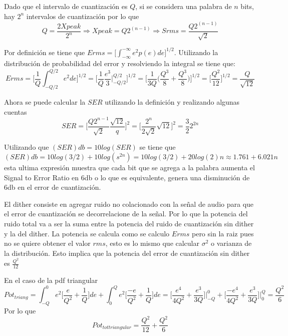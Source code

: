 \documentclass[a4paper]{article}
\begin{document}
\newline
Dado que el intervalo de cuantización es $Q$, si se considera una palabra de $n$ bits, hay $2^n$ intervalos de cuantización por lo que
$$
Q = \frac{2Xpeak}{2^n} \Rightarrow Xpeak = Q2^{(n-1)} 
\Rightarrow Srms = \frac{Q2^{(n-1)}}{\sqrt{2}}
$$

\newline
Por definición se tiene que $Erms = \bigg[\int^{-\infty}_{-\infty} e^2p(e)de\bigg]^{1/2}$. Utilizando la distribución de probabilidad del error y resolviendo la integral se tiene que:
$$
Erms = \bigg[\frac{1}{Q}\int_{-Q/2}^{Q/2} e^2de\bigg]^{1/2}
= \bigg[\frac{1}{Q}\frac{e^3}{3}\bigg|^{Q/2}_{-Q/2}\bigg]^{1/2}
= \bigg[\frac{1}{3Q}\bigg(\frac{Q^3}{8}+\frac{Q^3}{8}\bigg)\bigg]^{1/2}
= \bigg[\frac{Q^2}{12}\bigg]^{1/2}
= \frac{Q}{\sqrt{12}}
$$

\newline
Ahora se puede calcular la $SER$ utilizando la definición y realizando algunas cuentas
$$
SER = \bigg[\frac{Q2^{n-1}}{\sqrt{2}}\frac{\sqrt{12}}{q}\bigg]^2
= \bigg[\frac{2^n}{2\sqrt{2}}\sqrt{12}\bigg]^2 
= \frac{3}{2}2^{2n}
$$

\newline
Utilizando que $(SER)db = 10log(SER)$ se tiene que
$$
(SER)db = 10log(3/2) + 10log(s^{2n}) = 10log(3/2) +20log(2)n \approx 1.761 + 6.021n
$$
esta ultima expresión muestra que cada bit que se agrega a la palabra aumenta el Signal to Error Ratio en 6db o lo que es equivalente, genera una disminución de 6db en el error de cuantización.

\newline
El dither consiste en agregar ruido no colacionado con la señal de audio para que el error de cuantización se decorrelacione de la señal. Por lo que la potencia del ruido total va a ser la suma entre la potencia del ruido de cuantización sin dither y la del dither. La potencia se calcula como se calculo $Erms$ pero sin la raiz pues no se quiere obtener el valor $rms$, esto es lo mismo que calcular $\sigma^2$ o varianza de la distribución. Esto implica que la potencia del error de cuantización sin dither es $\frac{Q^2}{12}$

\newline
En el caso de la pdf triangular 
$$
Pot_{triang} = \int_{-Q}^{0}e^2\bigg[\frac{e}{Q^2}+\frac{1}{Q}\bigg]de + \int_{0}^{Q}e^2\bigg[\frac{-e}{Q^2}+\frac{1}{Q}\bigg]de
= \bigg[\frac{e^4}{4Q^2} + \frac{e^3}{3Q}\bigg]\bigg|_{-Q}^{0}
+ \bigg[\frac{-e^4}{4Q^2} + \frac{e^3}{3Q}\bigg]\bigg|_{0}^{Q}
= \frac{Q^2}{6}
$$
Por lo que 
$$
Pot_{tot triangular} = \frac{Q^2}{12} + \frac{Q^2}{6}
$$
\end{document}
